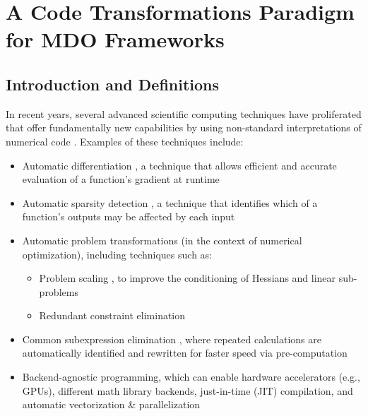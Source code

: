 \chapter{A Code Transformations Paradigm for MDO Frameworks}
\label{chap:code_transformations}


\section{Introduction and Definitions}

In recent years, several advanced scientific computing techniques have proliferated that offer fundamentally new capabilities by using non-standard interpretations of numerical code \cite{rackauckas_generalizing_2021}. Examples of these techniques include:

\begin{itemize}[noitemsep]
    \item Automatic differentiation \cite{griewank_automatic_1988}, a technique that allows efficient and accurate evaluation of a function's gradient at runtime
    \item Automatic sparsity detection \cite{gebremedhin_efficient_2009}, a technique that identifies which of a function's outputs may be affected by each input
    \item Automatic problem transformations (in the context of numerical optimization), including techniques such as:
    \begin{itemize}[noitemsep]
        \item Problem scaling \cite{nocedal_numerical_2006}, to improve the conditioning of Hessians and linear sub-problems
        \item Redundant constraint elimination
    \end{itemize}
    \item Common subexpression elimination \cite{casadi}, where repeated calculations are automatically identified and rewritten for faster speed via pre-computation
    \item Backend-agnostic programming, which can enable hardware accelerators (e.g., GPUs), different math library backends, just-in-time (JIT) compilation, and automatic vectorization \& parallelization \cite{jax}
\end{itemize}


